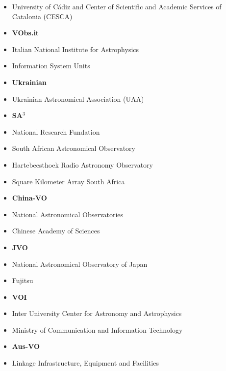 \begin{itemize}
	\item University of Cádiz and Center of Scientific and Academic Services of Catalonia (CESCA)
	\item \textbf{VObs.it}
	\item Italian National Institute for Astrophysics
	\item Information System Units
	\item \textbf{Ukrainian}
	\item Ukrainian Astronomical Association (UAA)
	\item \textbf{SA$^3$}
	\item National Research Fundation
	\item South African Astronomical Observatory
	\item Hartebeesthoek Radio Astronomy Observatory
	\item Square Kilometer Array South Africa 
	\item \textbf{China-VO}
	\item National Astronomical Observatories
	\item Chinese Academy of Sciences
	\item \textbf{JVO}
	\item National Astronomical Observatory of Japan
	\item Fujitsu
	\item \textbf{VOI}
	\item Inter University Center for Astronomy and Astrophysics
	\item Ministry of Communication and Information Technology
	\item \textbf{Aus-VO}
	\item Linkage Infrastructure, Equipment and Facilities
\end{itemize}






